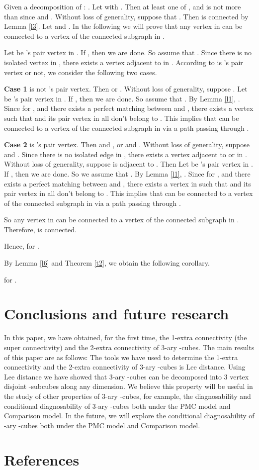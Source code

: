 \documentclass[preprint,number,12pt]{elsarticle}
\begin{document}
Given a decomposition of : .
Let  with .
Then at least one of ,  and  is not more than  since  and . Without loss of generality, suppose that . Then  is connected by Lemma \ref{l3}.
Let  and .
In the following we will prove that any vertex  in  can be connected to a vertex of the connected subgraph  in .

Let  be 's pair vertex in . If , then we are done. So assume that . Since there is no isolated vertex in , there exists a vertex  adjacent to  in . According to  is 's pair vertex or not, we consider the following two cases.

\textbf{Case 1 }  is not 's pair vertex.
Then  or .
Without loss of generality, suppose .
Let  be 's pair vertex in . If ,
then we are done. So assume that .
By Lemma \ref{l1}, .
Since  for , and there exists a perfect matching between
 and , there exists a vertex  such that
 and its pair vertex  in  all don't belong to .
This implies that  can be connected to a vertex of the connected subgraph  in 
via a path passing through .

\textbf{Case 2 }  is 's pair vertex. Then  and ,
or  and .
Without loss of generality, suppose  and .
Since there is no isolated edge in , there exists a vertex  adjacent to  or  in . Without loss of generality, suppose  is adjacent to . Then 
Let  be 's pair vertex in . If , then we are done.
So we assume that .
By Lemma \ref{l1}, . Since
 for , and there exists a perfect matching between
 and , there
exists a vertex  in  such that  and its pair vertex  in 
all don't belong to .
This implies that  can be connected to a vertex of the connected subgraph  in 
 via a path passing through .

So any vertex in  can be connected to a vertex of the connected subgraph  in . Therefore,  is connected. 

Hence,  for .



By Lemma \ref{l6} and Theorem \ref{t2}, we obtain the following corollary.
\begin{cor}
 for .
\end{cor}

\section{Conclusions and future research}
In this paper, we have obtained, for the first time, the 1-extra connectivity (the super connectivity) and the 2-extra connectivity of 3-ary -cubes.
The main results of this paper are as follows: 
The tools we have used to determine the 1-extra connectivity and the 2-extra connectivity of 3-ary -cubes is Lee distance.  Using Lee distance we have showed that 3-ary -cubes can be decomposed into 3 vertex disjoint -subcubes along any dimension. We believe this property will be useful in the study of other properties of 3-ary -cubes, for example,   the diagnosability and conditional diagnosability of 3-ary -cubes both  under the PMC model and Comparison model. In the future, we will explore the conditional diagnosability of -ary -cubes both under the PMC model and Comparison model.









\section*{References}


\end{document}
